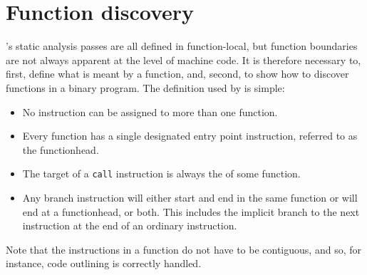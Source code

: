 



\section{Function discovery}
\label{sect:program_model:functions}



{\Technique}'s static analysis passes are all defined in function-local, but
function boundaries are not always apparent at the level of machine
code.  It is therefore necessary to, first, define what is meant by a
function, and, second, to show how to discover functions in a binary
program.  The definition used by {\technique} is simple:

\begin{itemize}
\item
  No instruction can be assigned to more than one function.
\item
  Every function has a single designated entry point instruction,
  referred to as the \gls{functionhead}.
\item
  The target of a \texttt{call} instruction is always the
   of some function.  
\item
  Any branch instruction will either start and end in the same
  function or will end at a \gls{functionhead}, or both.  This
  includes the implicit branch to the next instruction at the end of
  an ordinary instruction.
\end{itemize}

Note that the instructions in a function do not have to be contiguous,
and so, for instance, code outlining is correctly
handled\editorial{}.

